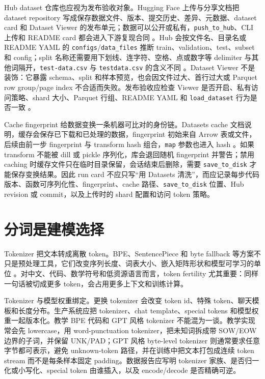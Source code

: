 \documentclass[UTF8,zihao=-4,openany]{ctexbook}
\begin{document}
Hub dataset 仓库也应视为发布验收对象。Hugging Face 上传与分享文档把 dataset repository 写成保存数据文件、版本、提交历史、差异、元数据、dataset card 和 Dataset Viewer 的发布单元；数据可以公开或私有，\texttt{push\_to\_hub}、CLI 上传和 README card 都会进入下游复现合同 \cite{huggingface2026datasetupload,huggingface2026datasetshare}。Hub 会按文件名、目录名或 README YAML 的 \texttt{configs}/\texttt{data\_files} 推断 train、validation、test、subset 和 config；split 名称还需要用下划线、连字符、空格、点或数字等 delimiter 与其他词隔开，\texttt{test-data.csv} 与 \texttt{testdata.csv} 的含义不同 \cite{huggingface2026hubdatasetsfilenames,huggingface2026hubdatasetsviewer}。Dataset Viewer 不是装饰：它暴露 schema、split 和样本预览，也会因文件过大、首行过大或 Parquet row group/page index 不合适而失败。发布验收应检查 Viewer 是否开启、私有访问策略、shard 大小、Parquet 行组、README YAML 和 \texttt{load\_dataset} 行为是否一致 \cite{huggingface2026hubdatasetsfiles,huggingface2026hubdatasetsllmupload}。

Cache fingerprint 给数据变换一条机器可比对的身份链。Datasets cache 文档说明，缓存会保存已下载和已处理的数据，fingerprint 初始来自 Arrow 表或文件，后续由前一步 fingerprint 与 transform hash 组合，\texttt{map} 参数也进入 hash \cite{huggingface2026datasetscache}。如果 transform 不能被 dill 或 pickle 序列化，库会退回随机 fingerprint 并警告；禁用 caching 时缓存文件只在临时目录保留，会话结束后删除，需要 \texttt{save\_to\_disk} 才能保存变换结果。因此 run card 不应只写“用 Datasets 清洗”，而应记录每步代码版本、函数可序列化性、fingerprint、cache 路径、\texttt{save\_to\_disk} 位置、Hub revision 或 commit，以及上传时的 shard 配置和访问 token 策略。

\section{分词是建模选择}
Tokenizer 把文本转成离散 token。BPE、SentencePiece 和 byte fallback 等方案不只是预处理工具，它们改变序列长度、词表大小、嵌入矩阵形状和模型可学习的单位 \cite{sennrich2016neural,kudo2018sentencepiece}。对中文、代码、数学符号和低资源语言而言，token fertility 尤其重要：同样一句话被切成更多 token，会占用更多上下文和训练计算。

Tokenizer 与模型权重绑定。更换 tokenizer 会改变 token id、特殊 token、聊天模板和长度分布。生产系统应把 tokenizer、chat template、special tokens 和模型权重一起版本化。教学 BPE 代码和 GPT 风格 tokenizer 不能混为一谈。教学实现常会先 lowercase，用 word-punctuation tokenizer，把未知词拆成带 SOW/EOW 边界的子词，并保留 UNK/PAD；GPT 风格 byte-level tokenizer 则通常要求任意字节都可表示，避免 unknown-token 路径，并在训练中把文本打包成连续 token stream 而不是每条样本固定 padding。数据报告应写明 tokenizer 家族、是否归一化或小写化、special token 由谁插入，以及 encode/decode 是否精确可逆。
\end{document}
